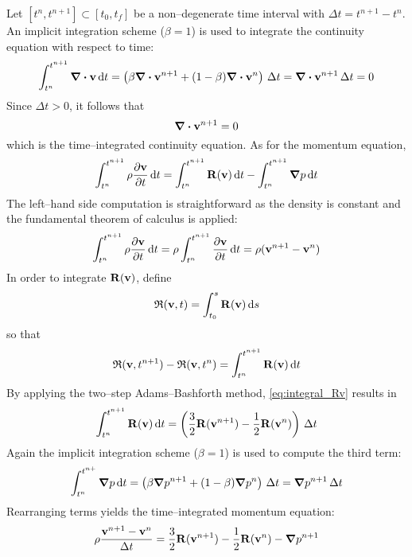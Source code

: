 Let $[t^n, t^{n+1}] \subset [t_0, t_f]$ be a non--degenerate time interval with $\Delta t = t^{n+1} - t^n$. An implicit integration scheme ($\beta = 1$) is used to integrate the continuity equation with respect to time:
\begin{gather*}
    \int_{t^n}^{t^{n+1}} \div{\vb{v}} \dd{t} =
    \left( \beta \div{\vb{v}}^{n+1} + (1 - \beta) \div{\vb{v}}^{n} \right) \, \Delta t =
    \div{\vb{v}}^{n+1} \, \Delta t = 0
\end{gather*}
Since $\Delta t > 0$, it follows that
\begin{equation} \label{eq:continuity_time_integrated}
    \div{\vb{v}}^{n+1} = 0
\end{equation}
which is the time--integrated continuity equation. As for the momentum equation,
\begin{equation*}
    \int_{t^n}^{t^{n+1}} \rho \pdv{\vb{v}}{t} \dd{t} =
    \int_{t^n}^{t^{n+1}} \vb{R}(\vb{v}) \dd{t} -
    \int_{t^n}^{t^{n+1}} \grad{p} \dd{t}
\end{equation*}
The left--hand side computation is straightforward as the density is constant and the fundamental theorem of calculus is applied:
\begin{equation*}
    \int_{t^n}^{t^{n+1}} \rho \pdv{\vb{v}}{t} \dd{t} =
    \rho \int_{t^n}^{t^{n+1}} \pdv{\vb{v}}{t} \dd{t} =
    \rho ( \vb{v}^{n+1} - \vb{v}^n )
\end{equation*}
In order to integrate $\vb{R}(\vb{v})$, define
\begin{equation*}
    \mathfrak{R}(\vb{v},t) = \int_{t_0}^s \vb{R}(\vb{v}) \dd{s}
\end{equation*}
so that
\begin{equation} \label{eq:integral_Rv}
    \mathfrak{R}(\vb{v},t^{n+1}) - \mathfrak{R}(\vb{v},t^{n}) =
    \int_{t^n}^{t^{n+1}} \vb{R}(\vb{v}) \dd{t}
\end{equation}
By applying the two--step Adams--Bashforth method, \eqref{eq:integral_Rv} results in
\begin{equation*}
    \int_{t^n}^{t^{n+1}} \vb{R}(\vb{v}) \dd{t} =
    \left( \frac{3}{2} \vb{R}(\vb{v}^{n+1}) - \frac{1}{2} \vb{R}(\vb{v}^n) \right) \, \Delta t
\end{equation*}
Again the implicit integration scheme ($\beta = 1$) is used to compute the third term:
\begin{equation*}
    \int_{t^n}^{t^{n+}} \grad{p} \dd{t} =
    \left( \beta \grad{p}^{n+1} + (1 - \beta) \grad{p}^n \right) \, \Delta t =
    \grad{p}^{n+1} \, \Delta t
\end{equation*}
Rearranging terms yields the time--integrated momentum equation:
\begin{equation}
    \rho \frac{\vb{v}^{n+1} - \vb{v}^n}{\Delta t} =
    \frac{3}{2} \vb{R}(\vb{v}^{n+1}) - \frac{1}{2} \vb{R}(\vb{v}^n) - \grad{p}^{n+1}
\end{equation}
